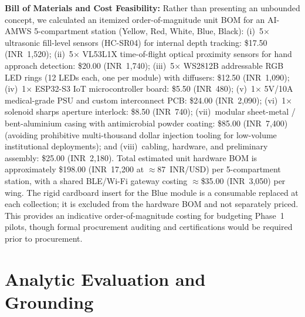 \documentclass[10pt,twocolumn,a4paper]{article}
\begin{document}
\textbf{Bill of Materials and Cost Feasibility:} Rather than presenting an unbounded concept, we calculated an itemized order-of-magnitude unit BOM for an AI-AMWS 5-compartment station (Yellow, Red, White, Blue, Black): (i)~5$\times$ ultrasonic fill-level sensors (HC-SR04) for internal depth tracking: \$17.50 (INR~1,520); (ii)~5$\times$ VL53L1X time-of-flight optical proximity sensors for hand approach detection: \$20.00 (INR~1,740); (iii)~5$\times$ WS2812B addressable RGB LED rings (12 LEDs each, one per module) with diffusers: \$12.50 (INR~1,090); (iv)~1$\times$ ESP32-S3 IoT microcontroller board: \$5.50 (INR~480); (v)~1$\times$ 5V/10A medical-grade PSU and custom interconnect PCB: \$24.00 (INR~2,090); (vi)~1$\times$ solenoid sharps aperture interlock: \$8.50 (INR~740); (vii)~modular sheet-metal / bent-aluminium casing with antimicrobial powder coating: \$85.00 (INR~7,400) (avoiding prohibitive multi-thousand dollar injection tooling for low-volume institutional deployments); and (viii)~cabling, hardware, and preliminary assembly: \$25.00 (INR~2,180). Total estimated unit hardware BOM is approximately \$198.00 (INR~17,200 at $\approx$87~INR/USD) per 5-compartment station, with a shared BLE/Wi-Fi gateway costing $\approx$\$35.00 (INR~3,050) per wing. The rigid cardboard insert for the Blue module is a consumable replaced at each collection; it is excluded from the hardware BOM and not separately priced. This provides an indicative order-of-magnitude costing for budgeting Phase~1 pilots, though formal procurement auditing and certifications would be required prior to procurement.

\section{Analytic Evaluation and Grounding}
\end{document}
